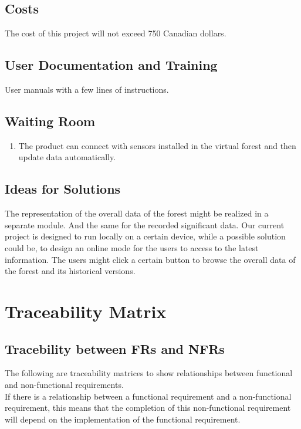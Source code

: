 \documentclass{article}
\begin{document}
\subsection{Costs}
The cost of this project will not exceed 750 Canadian dollars.
\subsection{User Documentation and Training}
User manuals with a few lines of instructions. 
\subsection{Waiting Room}
\begin{enumerate}
\item The product can connect with sensors installed in the 
virtual forest and then update data automatically. 
\end{enumerate}
\subsection{Ideas for Solutions}
The representation of the overall data of the forest might be realized in a separate module. And the same for the recorded significant data. Our current project is designed to run locally on a certain device, while a possible solution could be, to design an online mode for the users to access to the latest information. The users might click a certain button to browse the overall data of the forest and its historical versions. 

\newpage

\section{Traceability Matrix}
\newcommand{\CM}{\checkmark}
\subsection{Tracebility between FRs and NFRs}
The following are traceability matrices to show relationships between
functional and non-functional requirements.\\
If there is a relationship between a functional requirement and a non-functional requirement, 
this means that the completion of this non-functional requirement will depend on the implementation of the functional requirement.
\end{document}
